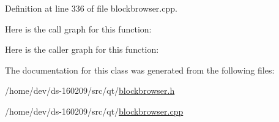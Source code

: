 Definition at line 336 of file blockbrowser.\+cpp.



Here is the call graph for this function\+:




Here is the caller graph for this function\+:




The documentation for this class was generated from the following files\+:\begin{DoxyCompactItemize}
\item 
/home/dev/ds-\/160209/src/qt/\hyperlink{blockbrowser_8h}{blockbrowser.\+h}\item 
/home/dev/ds-\/160209/src/qt/\hyperlink{blockbrowser_8cpp}{blockbrowser.\+cpp}\end{DoxyCompactItemize}
